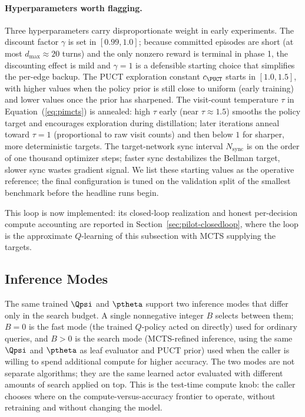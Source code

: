 \paragraph{Hyperparameters worth flagging.}
Three hyperparameters carry disproportionate weight in early
experiments. The discount factor $\gamma$ is set in $[0.99, 1.0]$;
because committed episodes are short (at most $d_{\max} \approx 20$
turns) and the only nonzero reward is terminal in phase 1, the
discounting effect is mild and $\gamma = 1$ is a defensible starting
choice that simplifies the per-edge backup. The PUCT exploration
constant $c_{\PUCT}$ starts in $[1.0, 1.5]$, with higher values when
the policy prior is still close to uniform (early training) and lower
values once the prior has sharpened. The visit-count temperature
$\tau$ in Equation~(\ref{eq:pimcts}) is annealed: high $\tau$ early
(near $\tau \approx 1.5$) smooths the policy target and encourages
exploration during distillation; later iterations anneal toward
$\tau = 1$ (proportional to raw visit counts) and then below $1$ for
sharper, more deterministic targets. The target-network sync interval
$N_{\mathrm{sync}}$ is on the order of one thousand optimizer steps; faster sync
destabilizes the Bellman target, slower sync wastes gradient signal.
We list these starting values as the operative reference; the final
configuration is tuned on the validation split of the smallest
benchmark before the headline runs begin.

This loop is now implemented: its closed-loop realization and honest
per-decision compute accounting are reported in
Section~\ref{sec:pilot-closedloop}, where the loop is the approximate
$Q$-learning of this subsection with MCTS supplying the targets.

\subsection{Inference Modes}
\label{sec:method-inference}

The same trained $\Qpsi$ and $\ptheta$ support two inference modes that
differ only in the search budget. A single nonnegative integer $B$
selects between them; $B = 0$ is the fast mode (the trained $Q$-policy
acted on directly) used for ordinary queries, and $B > 0$ is the search
mode (MCTS-refined inference, using the same $\Qpsi$ and $\ptheta$ as
leaf evaluator and PUCT prior) used when the caller is willing to spend
additional compute for higher accuracy. The two modes are not separate
algorithms; they are the same learned actor evaluated with different
amounts of search applied on top. This is the test-time compute knob:
the caller chooses where on the compute-versus-accuracy frontier to
operate, without retraining and without changing the model.

